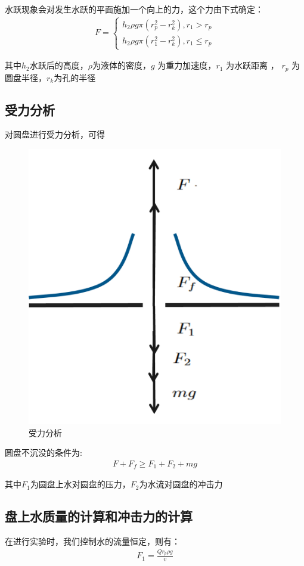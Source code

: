 \documentclass[UTF8]{gapd}
\begin{document}
水跃现象会对发生水跃的平面施加一个向上的力，这个力由下式确定：
\begin{align}
    F=\begin{cases}
        h_2\rho g \pi (r_p^2-r_k^2),r_1>r_p\\
        h_2\rho g \pi (r_1^2-r_k^2),r_1\le r_p
    \end{cases} \label{eq:unsinkable_disc_core}
\end{align}

其中$h_2$水跃后的高度，$\rho$为液体的密度，$g$ 为重力加速度，$r_1$  为水跃距离 ， $r_p$ 为圆盘半径，$r_k$为孔的半径
\subsection{受力分析}

对圆盘进行受力分析，可得
\begin{figure}[!htbp]%
  \centering
  \includegraphics[width=0.8\columnwidth]{images/f_analysis.png}
  \caption{受力分析} 
  \label{fig:unsinkable_disc_force_analysis}%
\end{figure}

圆盘不沉没的条件为:
\begin{align}
    F+F_f\ge F_1+F_2+mg 
\end{align}

其中$F_1$为圆盘上水对圆盘的压力，$F_2$为水流对圆盘的冲击力
\subsection{盘上水质量的计算和冲击力的计算}
在进行实验时，我们控制水的流量恒定，则有：
\begin{align}
    F_1=\frac{Qr_p\rho g}{v}
\end{align}
\end{document}
